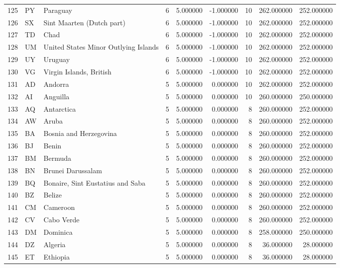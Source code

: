 \begin{tabular}{lllrrrrrr}
125 & PY & Paraguay & 6 & 5.000000 & -1.000000 & 10 & 262.000000 & 252.000000 \\
126 & SX & Sint Maarten (Dutch part) & 6 & 5.000000 & -1.000000 & 10 & 262.000000 & 252.000000 \\
127 & TD & Chad & 6 & 5.000000 & -1.000000 & 10 & 262.000000 & 252.000000 \\
128 & UM & United States Minor Outlying Islands & 6 & 5.000000 & -1.000000 & 10 & 262.000000 & 252.000000 \\
129 & UY & Uruguay & 6 & 5.000000 & -1.000000 & 10 & 262.000000 & 252.000000 \\
130 & VG & Virgin Islands, British & 6 & 5.000000 & -1.000000 & 10 & 262.000000 & 252.000000 \\
131 & AD & Andorra & 5 & 5.000000 & 0.000000 & 10 & 262.000000 & 252.000000 \\
132 & AI & Anguilla & 5 & 5.000000 & 0.000000 & 10 & 260.000000 & 250.000000 \\
133 & AQ & Antarctica & 5 & 5.000000 & 0.000000 & 8 & 260.000000 & 252.000000 \\
134 & AW & Aruba & 5 & 5.000000 & 0.000000 & 8 & 260.000000 & 252.000000 \\
135 & BA & Bosnia and Herzegovina & 5 & 5.000000 & 0.000000 & 8 & 260.000000 & 252.000000 \\
136 & BJ & Benin & 5 & 5.000000 & 0.000000 & 8 & 260.000000 & 252.000000 \\
137 & BM & Bermuda & 5 & 5.000000 & 0.000000 & 8 & 260.000000 & 252.000000 \\
138 & BN & Brunei Darussalam & 5 & 5.000000 & 0.000000 & 8 & 260.000000 & 252.000000 \\
139 & BQ & Bonaire, Sint Eustatius and Saba & 5 & 5.000000 & 0.000000 & 8 & 260.000000 & 252.000000 \\
140 & BZ & Belize & 5 & 5.000000 & 0.000000 & 8 & 260.000000 & 252.000000 \\
141 & CM & Cameroon & 5 & 5.000000 & 0.000000 & 8 & 260.000000 & 252.000000 \\
142 & CV & Cabo Verde & 5 & 5.000000 & 0.000000 & 8 & 260.000000 & 252.000000 \\
143 & DM & Dominica & 5 & 5.000000 & 0.000000 & 8 & 258.000000 & 250.000000 \\
144 & DZ & Algeria & 5 & 5.000000 & 0.000000 & 8 & 36.000000 & 28.000000 \\
145 & ET & Ethiopia & 5 & 5.000000 & 0.000000 & 8 & 36.000000 & 28.000000 \\

\end{tabular}
